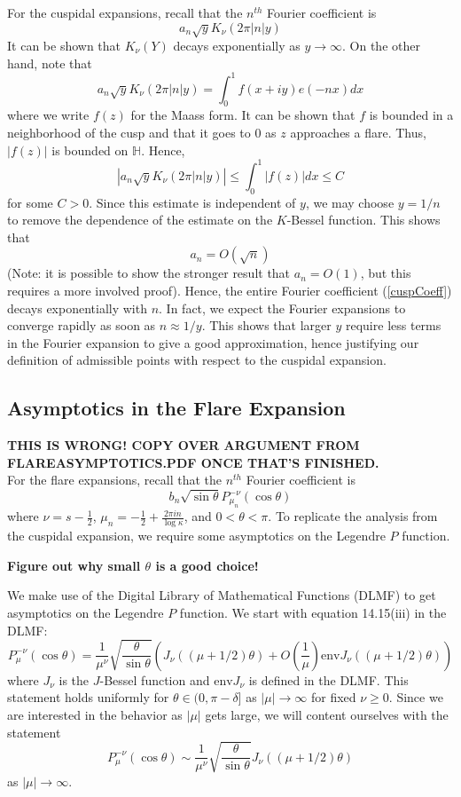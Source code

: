 \documentclass[]{article}
\begin{document}
For the cuspidal expansions, recall that the $n^{th}$ Fourier coefficient is
\begin{equation}\label{cuspCoeff}
a_n\sqrt{y}K_\nu(2\pi|n|y)
\end{equation}
It can be shown that $K_\nu(Y)$ decays exponentially as $y \rightarrow \infty$.
On the other hand, note that
$$
a_n\sqrt{y}K_\nu(2\pi|n|y) = \int_{0}^{1}f(x + iy)e(-nx)dx
$$
where we write $f(z)$ for the Maass form.
It can be shown that $f$ is bounded in a neighborhood of the cusp and that it goes to $0$ as $z$ approaches a flare.
Thus, $|f(z)|$ is bounded on $\mathbb{H}$.
Hence,
$$
|a_n\sqrt{y}K_\nu(2\pi|n|y)| \leq \int_{0}^{1}|f(z)|dx \leq C
$$
for some $C > 0$.
Since this estimate is independent of $y$, we may choose $y = 1/n$ to remove the dependence of the estimate on the $K$-Bessel function.
This shows that
$$
a_n = O(\sqrt{n})
$$
(Note: it is possible to show the stronger result that $a_n = O(1)$, but this requires a more involved proof).
Hence, the entire Fourier coefficient (\ref{cuspCoeff}) decays exponentially with $n$.
In fact, we expect the Fourier expansions to converge rapidly as soon as $n \approx 1/y$.
This shows that larger $y$ require less terms in the Fourier expansion to give a good approximation, hence justifying our definition of admissible points with respect to the cuspidal expansion.

\subsection*{Asymptotics in the Flare Expansion}

\textbf{THIS IS WRONG! COPY OVER ARGUMENT FROM FLAREASYMPTOTICS.PDF ONCE THAT'S FINISHED.}
\\

For the flare expansions, recall that the $n^{th}$ Fourier coefficient is
$$
b_n\sqrt{\sin\theta}P^{-\nu}_{\mu_n}(\cos\theta)
$$
where $\nu = s - \frac{1}{2}$, $\mu_n = -\frac{1}{2} + \frac{2\pi in}{\log\kappa}$, and $0 < \theta < \pi$.
To replicate the analysis from the cuspidal expansion, we require some asymptotics on the Legendre $P$ function.

\textbf{Figure out why small $\theta$ is a good choice!}

We make use of the Digital Library of Mathematical Functions (DLMF) to get asymptotics on the Legendre $P$ function.
We start with equation 14.15(iii) in the DLMF:
$$
P_\mu^{-\nu}(\cos\theta) = \frac{1}{\mu^\nu}\sqrt{\frac{\theta}{\sin\theta}}\left( J_\nu((\mu+1/2)\theta) + O\left( \frac{1}{\mu} \right)\text{env}J_\nu((\mu+1/2)\theta) \right)
$$
where $J_\nu$ is the $J$-Bessel function and $\text{env}J_\nu$ is defined in the DLMF.
This statement holds uniformly for $\theta \in (0, \pi - \delta]$ as $|\mu| \rightarrow \infty$ for fixed $\nu \geq 0$.
Since we are interested in the behavior as $|\mu|$ gets large, we will content ourselves with the statement
$$
P_\mu^{-\nu}(\cos\theta) \sim \frac{1}{\mu^\nu}\sqrt{\frac{\theta}{\sin\theta}}J_\nu((\mu+1/2)\theta)
$$
as $|\mu| \rightarrow \infty$.
\end{document}
